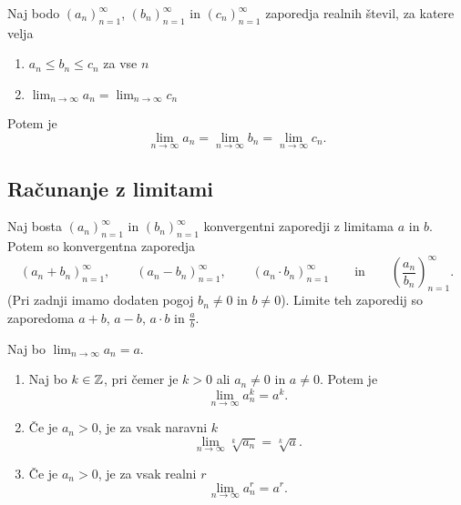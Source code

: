 \documentclass[12pt, a4paper]{article}
\begin{document}
\obvs

\begin{izrek}[O sendviču]
Naj bodo $(a_n)_{n=1}^\infty$, $(b_n)_{n=1}^\infty$ in $(c_n)_{n=1}^\infty$ zaporedja realnih števil, za katere velja

\begin{enumerate}[label=\arabic*)]
\item $a_n\leq b_n\leq c_n$ za vse $n$
\item $\displaystyle\lim_{n\to\infty}a_n=\lim_{n\to\infty}c_n$
\end{enumerate}

Potem je
\[
\lim_{n\to\infty}a_n=\lim_{n\to\infty}b_n=\lim_{n\to\infty}c_n.
\]
\end{izrek}

\obvs

\newpage

\subsection{Računanje z limitami}

\begin{izrek}
Naj bosta $(a_n)_{n=1}^\infty$ in $(b_n)_{n=1}^\infty$ konvergentni zaporedji z limitama $a$ in $b$. Potem so konvergentna zaporedja
\[
(a_n+b_n)_{n=1}^\infty,\qquad (a_n-b_n)_{n=1}^\infty,\qquad (a_n\cdot b_n)_{n=1}^\infty\qquad\text{in}\qquad\left(\frac{a_n}{b_n}\right)_{n=1}^\infty.
\]
(Pri zadnji imamo dodaten pogoj $b_n\ne 0$ in $b\ne 0$). Limite teh zaporedij so zaporedoma $a+b$, $a-b$, $a\cdot b$ in $\frac{a}{b}$.
\end{izrek}

\obvs

\begin{posledica}
Naj bo $\displaystyle\lim_{n\to\infty}a_n=a$.

\begin{enumerate}[label=\arabic*)]
\item Naj bo $k\in\mathbb{Z}$, pri čemer je $k>0$ ali $a_n\ne 0$ in $a\ne 0$. Potem je
\[
\lim_{n\to\infty}a_n^k=a^k.
\]
\item Če je $a_n>0$, je za vsak naravni $k$
\[
\lim_{n\to\infty}\sqrt[k]{a_n}=\sqrt[k]{a}.
\]
\item Če je $a_n>0$, je za vsak realni $r$
\[
\lim_{n\to\infty}a_n^r=a^r.
\]
\end{enumerate}
\end{posledica}
\end{document}
